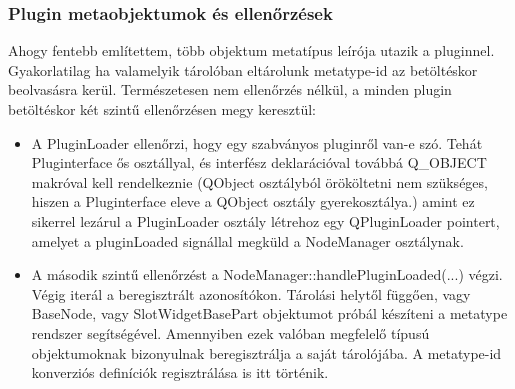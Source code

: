 \documentclass[a4paper,12pt,oneside]{report}
\begin{document}
\subsubsection{Plugin metaobjektumok és ellenőrzések}
Ahogy fentebb említettem, több objektum metatípus leírója utazik a pluginnel. Gyakorlatilag ha valamelyik tárolóban eltárolunk metatype-id az betöltéskor beolvasásra kerül. Természetesen nem ellenőrzés nélkül, a minden plugin betöltéskor két szintű ellenőrzésen megy keresztül:
\begin{itemize}
	\itemsep0em
	\item A PluginLoader ellenőrzi, hogy egy szabványos pluginről van-e szó. Tehát Pluginterface ős osztállyal, és interfész deklarációval továbbá Q\_OBJECT makróval kell rendelkeznie (QObject osztályból örököltetni nem szükséges, hiszen a Pluginterface eleve a QObject osztály gyerekosztálya.) amint ez sikerrel lezárul a PluginLoader osztály létrehoz egy QPluginLoader pointert, amelyet a pluginLoaded signállal megküld a NodeManager osztálynak.
	\item A második szintű ellenőrzést a NodeManager::handlePluginLoaded(...) végzi. Végig iterál a beregisztrált azonosítókon. Tárolási helytől függően, vagy BaseNode, vagy SlotWidgetBasePart objektumot próbál készíteni a metatype rendszer segítségével. Amennyiben ezek valóban megfelelő típusú objektumoknak bizonyulnak beregisztrálja a saját tárolójába. A metatype-id konverziós definíciók regisztrálása is itt történik.
\end{itemize}
\end{document}
